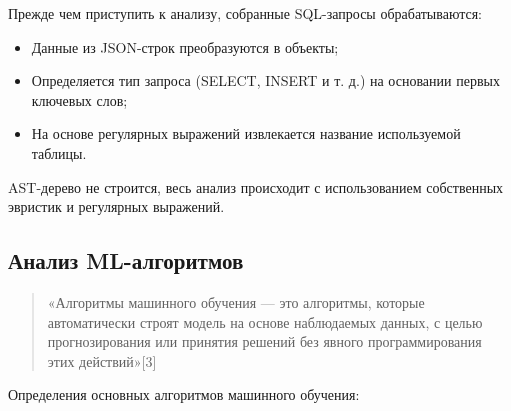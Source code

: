 \documentclass[14pt]{extarticle}
\begin{document}
Прежде чем приступить к анализу, собранные SQL-запросы обрабатываются:
\begin{itemize}
    \item Данные из JSON-строк преобразуются в объекты;
    \item Определяется тип запроса (SELECT, INSERT и т. д.) на основании первых ключевых слов;
    \item На основе регулярных выражений извлекается название используемой таблицы.
\end{itemize}

AST-дерево не строится, весь анализ происходит с использованием собственных эвристик и регулярных выражений.

\subsection{Анализ ML-алгоритмов}

\begin{quote}
«Алгоритмы машинного обучения — это алгоритмы, которые автоматически строят модель на основе наблюдаемых данных, с целью прогнозирования или принятия решений без явного программирования этих действий»[3]\end{quote}

Определения основных алгоритмов машинного обучения:
\end{document}
